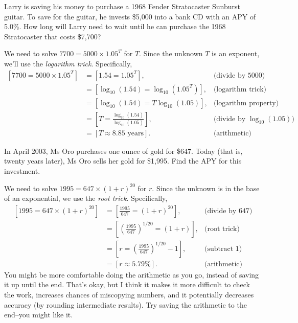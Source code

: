 \documentclass[12pt,fleqn,answers]{exam}
\begin{document}
\begin{questions}
\question [2] Larry is saving his money to purchase a
1968 Fender Stratocaster Sunburst guitar.
To save for the guitar, he invests \$5,000 into a bank CD with an APY of 5.0\%. 
How long will Larry need to wait until he can purchase the 1968 Stratocaster that costs
\$7,700?

\begin{solution}%
    We need to solve $7700 = 5000 \times 1.05^T$ for $T$. Since the unknown
    $T$ is an exponent, we'll use the \emph{logarithm trick}. Specifically,
    \begin{align*}
      \left[7700 = 5000 \times 1.05^T \right] &= \left[1.54 = 1.05^T \right], &\mbox{(divide by 5000)} \\
                     &= \left[\log_{10}(1.54) = \log_{10}(1.05^T) \right],  &\mbox{(logarithm trick)} \\
                     &= \left[\log_{10}(1.54) = T \log_{10}(1.05) \right],  &\mbox{(logarithm property)} \\
                     &= \left[ T = \frac{\log_{10}(1.54)}{\log_{10}(1.05)} \right],  &\mbox{(divide by $\log_{10}(1.05)$)} \\
                     &= \left[ T \approx 8.85 \mbox{ years} \right].  &\mbox{(arithmetic)}
    \end{align*}

\end{solution}

\question [2] In April 2003, Ms Oro purchases one ounce of gold for \$647. 
Today (that is, twenty years later), Ms Oro sells her gold for \$1,995.
Find the APY for this investment.
\begin{solution}[3.0in]
We need to solve $1995 = 647 \times (1+r)^{20}$ for $r$. Since 
the unknown is in the base of an exponential, we use the \emph{root trick}.
Specifically,
\begin{align*}
    \left[1995 = 647 \times (1+r)^{20} \right] &= \left[\frac{1995}{647} = (1+r)^{20} \right], & \mbox{(divide by 647)}\\
               &= \left[\left(\frac{1995}{647}\right)^{1/20} = (1+r) \right], & \mbox{(root trick)} \\
               &= \left[r = \left(\frac{1995}{647}\right)^{1/20} - 1 \right], & \mbox{(subtract 1)}\\
               &= \left[ r \approx 5.79\% \right]. &\mbox{(arithmetic)}
\end{align*}
You might be more comfortable doing the arithmetic as you go, instead
of saving it up until the end. That's okay, but I think it makes it
more difficult to check the work, increases chances of miscopying
numbers, and it potentially decreases accuracy (by rounding intermediate results).
Try saving the arithmetic to the end--you might like it.


\end{solution}
\end{questions}
\end{document}
